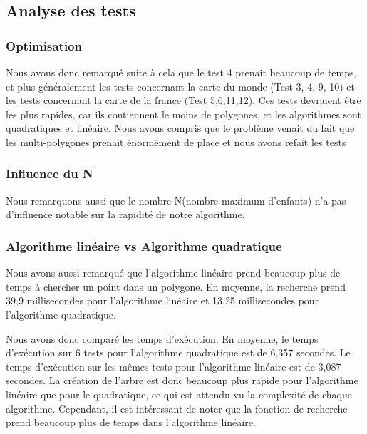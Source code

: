 \documentclass[utf8]{article}
\begin{document}
\begin{large}
    \subsection{Analyse des tests}\label{Analyse des tests}
    \subsubsection{Optimisation}
    \par
    \indent
    Nous avons donc remarqué suite à cela que le test 4 prenait beaucoup de temps,
    et plus généralement les tests concernant la carte du monde (Test 3, 4, 9, 10)
    et les tests concernant la carte de la france (Test 5,6,11,12). Ces tests
    devraient être les plus rapides, car ils contiennent le moins de polygones, et
    les algorithmes sont quadratiques et linéaire. Nous avons compris que le
    problème venait du fait que les multi-polygones prenait énormément de place et nous avons refait les tests
    \par
    \subsubsection{Influence du N}
    \par
    \indent
    Nous remarquons aussi que le nombre N(nombre maximum d'enfants) n'a pas
    d'influence notable sur la rapidité de notre algorithme.
    \par
    \subsubsection{Algorithme linéaire vs Algorithme quadratique}
    \par
    \indent
    Nous avons aussi remarqué que l'algorithme linéaire prend beaucoup plus de temps
    à chercher un point dans un polygone. En moyenne, la recherche prend 39,9
    millisecondes pour l'algorithme linéaire et 13,25 millisecondes pour
    l'algorithme quadratique.
    \par
    \indent
    \par
    Nous avons donc comparé les temps d'exécution. En moyenne, le temps
    d'exécution sur 6 tests pour l'algorithme quadratique est de 6,357 secondes.
    Le temps d'exécution sur les mêmes tests pour l'algorithme linéaire est de
    3,087 secondes. La création de l'arbre est donc beaucoup plus rapide pour
    l'algorithme linéaire que pour le quadratique, ce qui est attendu vu la
    complexité de chaque algorithme. Cependant, il est intéressant de noter que la
    fonction de recherche prend beaucoup plus de temps dans l'algorithme linéaire.
    \par


\end{large}
\end{document}

